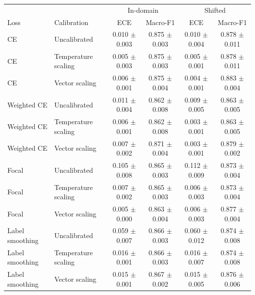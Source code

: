 \begin{tabular}{llcccc}
\hline
 & & \multicolumn{2}{c}{In-domain} & \multicolumn{2}{c}{Shifted} \\
Loss & Calibration & ECE & Macro-F1 & ECE & Macro-F1 \\
\hline
CE & Uncalibrated & 0.010 $\pm$ 0.003 & 0.875 $\pm$ 0.003 & 0.010 $\pm$ 0.004 & 0.878 $\pm$ 0.011 \\
CE & Temperature scaling & 0.005 $\pm$ 0.003 & 0.875 $\pm$ 0.003 & 0.005 $\pm$ 0.001 & 0.878 $\pm$ 0.011 \\
CE & Vector scaling & 0.006 $\pm$ 0.001 & 0.875 $\pm$ 0.004 & 0.004 $\pm$ 0.001 & 0.883 $\pm$ 0.004 \\
Weighted CE & Uncalibrated & 0.011 $\pm$ 0.004 & 0.862 $\pm$ 0.008 & 0.009 $\pm$ 0.005 & 0.863 $\pm$ 0.005 \\
Weighted CE & Temperature scaling & 0.006 $\pm$ 0.001 & 0.862 $\pm$ 0.008 & 0.003 $\pm$ 0.001 & 0.863 $\pm$ 0.005 \\
Weighted CE & Vector scaling & 0.007 $\pm$ 0.002 & 0.871 $\pm$ 0.004 & 0.003 $\pm$ 0.001 & 0.879 $\pm$ 0.002 \\
Focal & Uncalibrated & 0.105 $\pm$ 0.008 & 0.865 $\pm$ 0.003 & 0.112 $\pm$ 0.009 & 0.873 $\pm$ 0.004 \\
Focal & Temperature scaling & 0.007 $\pm$ 0.002 & 0.865 $\pm$ 0.003 & 0.006 $\pm$ 0.003 & 0.873 $\pm$ 0.004 \\
Focal & Vector scaling & 0.005 $\pm$ 0.000 & 0.863 $\pm$ 0.004 & 0.006 $\pm$ 0.003 & 0.877 $\pm$ 0.004 \\
Label smoothing & Uncalibrated & 0.059 $\pm$ 0.007 & 0.866 $\pm$ 0.003 & 0.060 $\pm$ 0.012 & 0.874 $\pm$ 0.008 \\
Label smoothing & Temperature scaling & 0.016 $\pm$ 0.001 & 0.866 $\pm$ 0.003 & 0.016 $\pm$ 0.007 & 0.874 $\pm$ 0.008 \\
Label smoothing & Vector scaling & 0.015 $\pm$ 0.001 & 0.867 $\pm$ 0.002 & 0.015 $\pm$ 0.005 & 0.876 $\pm$ 0.006 \\
\hline
\end{tabular}